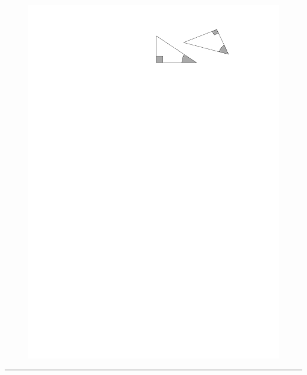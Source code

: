 \documentclass[12pt]{article}
\newcommand{\horrule}[1]{\rule{\linewidth}{#1}} %
\begin{document}
\begin{multicols}{2}
\begin{figure}[H]
  \centering
  \includegraphics[width=0.8\linewidth]{sources/2/exo1.pdf}
\end{figure}

\end{multicols}

\horrule{0.5pt}
\end{document}
